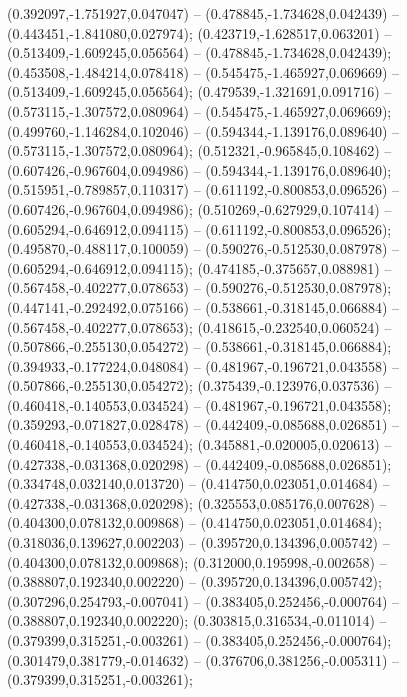  (0.392097,-1.751927,0.047047) -- (0.478845,-1.734628,0.042439) -- (0.443451,-1.841080,0.027974);
 (0.423719,-1.628517,0.063201) -- (0.513409,-1.609245,0.056564) -- (0.478845,-1.734628,0.042439);
 (0.453508,-1.484214,0.078418) -- (0.545475,-1.465927,0.069669) -- (0.513409,-1.609245,0.056564);
 (0.479539,-1.321691,0.091716) -- (0.573115,-1.307572,0.080964) -- (0.545475,-1.465927,0.069669);
 (0.499760,-1.146284,0.102046) -- (0.594344,-1.139176,0.089640) -- (0.573115,-1.307572,0.080964);
 (0.512321,-0.965845,0.108462) -- (0.607426,-0.967604,0.094986) -- (0.594344,-1.139176,0.089640);
 (0.515951,-0.789857,0.110317) -- (0.611192,-0.800853,0.096526) -- (0.607426,-0.967604,0.094986);
 (0.510269,-0.627929,0.107414) -- (0.605294,-0.646912,0.094115) -- (0.611192,-0.800853,0.096526);
 (0.495870,-0.488117,0.100059) -- (0.590276,-0.512530,0.087978) -- (0.605294,-0.646912,0.094115);
 (0.474185,-0.375657,0.088981) -- (0.567458,-0.402277,0.078653) -- (0.590276,-0.512530,0.087978);
 (0.447141,-0.292492,0.075166) -- (0.538661,-0.318145,0.066884) -- (0.567458,-0.402277,0.078653);
 (0.418615,-0.232540,0.060524) -- (0.507866,-0.255130,0.054272) -- (0.538661,-0.318145,0.066884);
 (0.394933,-0.177224,0.048084) -- (0.481967,-0.196721,0.043558) -- (0.507866,-0.255130,0.054272);
 (0.375439,-0.123976,0.037536) -- (0.460418,-0.140553,0.034524) -- (0.481967,-0.196721,0.043558);
 (0.359293,-0.071827,0.028478) -- (0.442409,-0.085688,0.026851) -- (0.460418,-0.140553,0.034524);
 (0.345881,-0.020005,0.020613) -- (0.427338,-0.031368,0.020298) -- (0.442409,-0.085688,0.026851);
 (0.334748,0.032140,0.013720) -- (0.414750,0.023051,0.014684) -- (0.427338,-0.031368,0.020298);
 (0.325553,0.085176,0.007628) -- (0.404300,0.078132,0.009868) -- (0.414750,0.023051,0.014684);
 (0.318036,0.139627,0.002203) -- (0.395720,0.134396,0.005742) -- (0.404300,0.078132,0.009868);
 (0.312000,0.195998,-0.002658) -- (0.388807,0.192340,0.002220) -- (0.395720,0.134396,0.005742);
 (0.307296,0.254793,-0.007041) -- (0.383405,0.252456,-0.000764) -- (0.388807,0.192340,0.002220);
 (0.303815,0.316534,-0.011014) -- (0.379399,0.315251,-0.003261) -- (0.383405,0.252456,-0.000764);
 (0.301479,0.381779,-0.014632) -- (0.376706,0.381256,-0.005311) -- (0.379399,0.315251,-0.003261);
